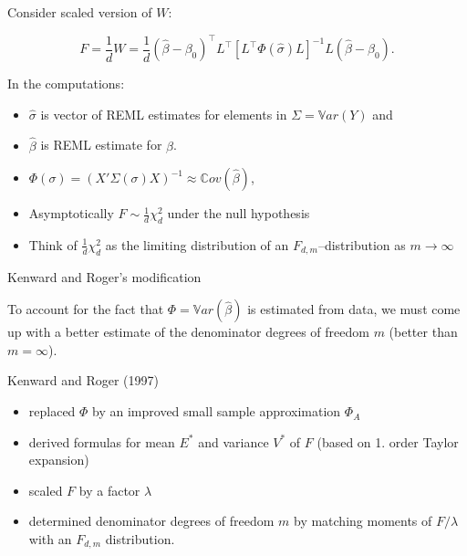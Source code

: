 \documentclass[
  ignorenonframetext,
]{beamer}
\def\bm{ }
\newcommand{\betab}{\bm{\beta}}
\newcommand{\Lb}{L}
\newcommand{\ssb}{{\hat \sigma}}
\newcommand{\transp}{^{\top}}
\newcommand{\var}{\mathbb{V}ar}
\newcommand{\cov}{\mathbb{C}ov}
\begin{document}
\begin{frame}

Consider scaled version of \(W\):

\begin{displaymath}
  F = \frac{1}{d} W = \frac{1}{d}(\hat \betab - \betab_0)\transp \Lb\transp [\Lb\transp \bm \Phi(\ssb) \Lb]^{-1}
 \Lb (\hat \betab - \betab_0).
\end{displaymath}

In the computations:

\begin{itemize}
\item
  \(\ssb\) is vector of REML estimates for elements in
  \(\Sigma=\var(Y)\) and
\item
  \(\hat \betab\) is REML estimate for \(\betab\).
\item
  \(\bm \Phi (\sigma) = (\bm X' \bm \Sigma(\sigma) \bm X)^{-1} \approx \cov(\hat \betab)\),
\item
  Asymptotically \(F \sim \frac{1}{d} \chi^2_d\) under the null
  hypothesis
\item
  Think of \(\frac{1}{d} \chi^2_d\) as the limiting distribution of an
  \(F_{d,m}\)--distribution as \(m\rightarrow \infty\)
\end{itemize}

\begin{block}{Kenward and Roger's modification}

To account for the fact that \(\bm\Phi=\var(\hat\beta)\) is estimated
from data, we must come up with a better estimate of the denominator
degrees of freedom \(m\) (better than \(m=\infty\)).

Kenward and Roger (1997)

\begin{itemize}
\item
  replaced \(\bm \Phi\) by an improved small sample approximation
  \(\bm \Phi_A\)
\item
  derived formulas for mean \(E^*\) and variance \(V^*\) of \(F\) (based
  on 1. order Taylor expansion)
\item
  scaled \(F\) by a factor \(\lambda\)
\item
  determined denominator degrees of freedom \(m\) by matching moments of
  \(F/\lambda\) with an \(F_{d,m}\) distribution.
\end{itemize}

\end{block}

\end{frame}
\end{document}
